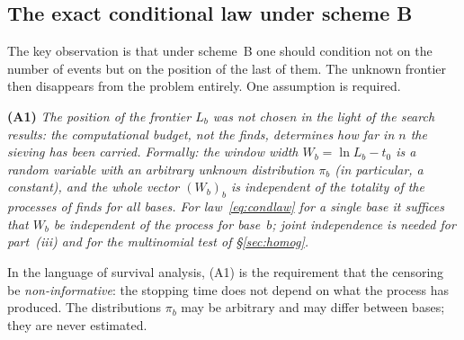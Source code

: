 \documentclass[11pt,a4paper]{article}
\theoremstyle{plain}
\theoremstyle{remark}
\begin{document}
\subsection{The exact conditional law under scheme B}\label{sec:exact}

The key observation is that under scheme~B one should condition not on the
number of events but on the position of the last of them. The unknown frontier
then disappears from the problem entirely. One assumption is required.

\medskip
\noindent\textbf{(A1)} \emph{The position of the frontier $L_b$ was not chosen in
the light of the search results: the computational budget, not the finds,
determines how far in $n$ the sieving has been carried. Formally: the window
width $W_b=\ln L_b-t_0$ is a random variable with an arbitrary unknown
distribution $\pi_b$ (in particular, a constant), and the whole vector
$(W_b)_b$ is independent of the totality of the processes of finds for all
bases. For law~\eqref{eq:condlaw} for a single base it suffices that $W_b$ be
independent of the process for base~$b$; joint independence is needed for
part~(iii) and for the multinomial test of \S\ref{sec:homog}.}

\medskip
\noindent In the language of survival analysis, (A1) is the requirement that the
censoring be \emph{non-informative}: the stopping time does not depend on what
the process has produced. The distributions $\pi_b$ may be arbitrary and may
differ between bases; they are never estimated.
\end{document}
